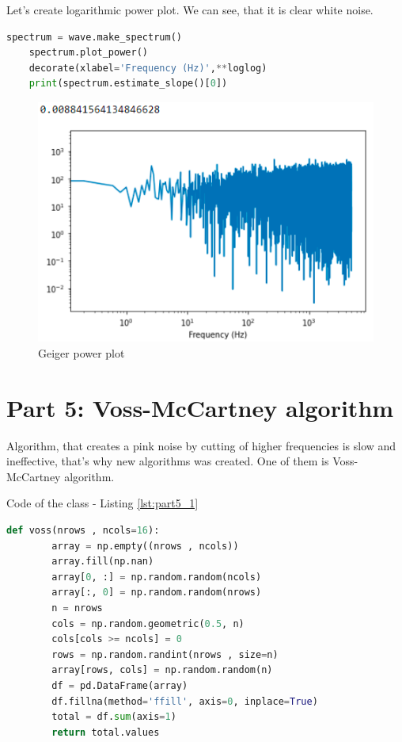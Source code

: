 \documentclass[a4paper]{article}
\begin{document}
            Let's create logarithmic power plot. We can see, that it is clear white noise.
            
            \begin{lstlisting}[language=Python,caption=Usage of Poisson,label={lst:part4}]
    spectrum = wave.make_spectrum()
    spectrum.plot_power()
    decorate(xlabel='Frequency (Hz)',**loglog)
    print(spectrum.estimate_slope()[0])
            \end{lstlisting}
            
            \begin{figure}[H]
                \centering
                \includegraphics[width=\textwidth]{img/geiget_power.png}
                \caption{Geiger power plot}
                \label{fig:part42}
            \end{figure}
            
    \newpage
        \section{Part 5: Voss-McCartney algorithm}
        
            Algorithm, that creates a pink noise by cutting of higher frequencies is slow and ineffective, that's why new algorithms was created. One of them is Voss-McCartney algorithm.
            
            Code of the class - Listing \ref{lst:part5_1}
            
            \begin{lstlisting}[language=Python,caption=Voss-McCartney algorithm,label={lst:part5_1}]
    def voss(nrows , ncols=16):
        array = np.empty((nrows , ncols))
        array.fill(np.nan)
        array[0, :] = np.random.random(ncols)
        array[:, 0] = np.random.random(nrows)
        n = nrows
        cols = np.random.geometric(0.5, n)
        cols[cols >= ncols] = 0
        rows = np.random.randint(nrows , size=n)
        array[rows, cols] = np.random.random(n)
        df = pd.DataFrame(array)
        df.fillna(method='ffill', axis=0, inplace=True)
        total = df.sum(axis=1)
        return total.values
            \end{lstlisting}
            
\end{document}
